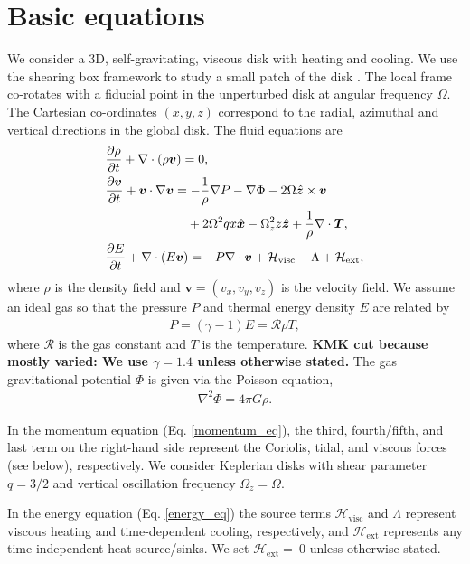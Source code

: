 \section{Basic equations}\label{basic}
We consider a 3D, self-gravitating,
viscous disk with heating and cooling. We use the shearing box framework to
study a small patch of the disk \citep{goldreich65}. The local frame
co-rotates with a fiducial point in the unperturbed disk at angular
frequency $\Omega$. The Cartesian co-ordinates $(x,y,z)$ correspond
to the radial, azimuthal and vertical directions in the global disk. 
The fluid equations are
\begin{align}
  &\frac{\p\rho}{\p t} + \nabla\cdot\left(\rho\bm{v}\right) = 0, \\
  & \frac{\p\bm{v}}{\p t} + \bm{v}\cdot\nabla\bm{v} =
  -\frac{1}{\rho}\nabla P - \nabla\Phi - 2\Omega\hat{\bm{z}}\times\bm{v}\notag\\ & 
  \phantom{\frac{\p\bm{v}}{\p t} + \bm{v}\cdot\nabla\bm{v} =}
  +2\Omega^2qx\hat{\bm{x}} -\Omega_z^2z\hat{\bm{z}} 
   + \frac{1}{\rho}\nabla\cdot\bm{T},\label{momentum_eq}\\
  & \frac{\p E}{\p t} + \nabla\cdot\left(E\bm{v}\right) = - P
  \nabla\cdot\bm{v} + \mathcal{H}_\mathrm{visc} - \Lambda +
  \mathcal{H}_\mathrm{ext} ,\label{energy_eq}
\end{align} 
where $\rho$ is the density field and $\bm{v} = (v_x, v_y, v_z)$ is
the velocity field. 
We assume an ideal gas so that the pressure $P$ and thermal energy
density $E$ are related by  
\begin{align}
  P = (\gamma-1)E = \mathcal{R}\rho T, 
\end{align}
where $\mathcal{R}$ is the gas constant and $T$ is the temperature. {\bf KMK cut because 
mostly varied: We
use $\gamma=1.4$ unless otherwise stated.} The gas 
gravitational potential $\Phi$ is given via the Poisson equation,  
\begin{align}
 \nabla^2\Phi = 4 \pi G \rho. 
\end{align}


In the momentum equation (Eq. \ref{momentum_eq}), the third,
fourth/fifth, and last term on the right-hand side represent the Coriolis, 
tidal, and viscous forces (see below), respectively. We consider    
Keplerian disks with shear parameter $q=3/2$ and vertical oscillation 
frequency $\Omega_z=\Omega$.  

In the energy equation (Eq. \ref{energy_eq}) the source terms 
$\mathcal{H}_\mathrm{visc}$ and $\Lambda$
represent viscous heating and time-dependent cooling, 
respectively, and $\mathcal{H}_\mathrm{ext}$ represents any
time-independent heat source/sinks. We set
$\mathcal{H}_\mathrm{ext}=~0$ unless otherwise stated.  


